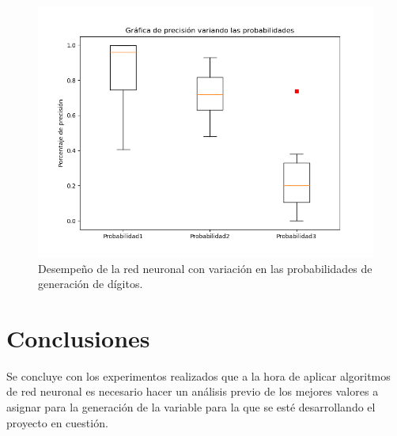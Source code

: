 \documentclass{article}
\begin{document}
\begin{figure}[H]
\centering
	\includegraphics[scale=0.8]{Figure_1.png}
	\caption{Desempeño de la red neuronal con variación en las probabilidades de generación de dígitos.}
	\label{1}		
\end{figure}



\section{Conclusiones}
Se concluye con los experimentos realizados que a la hora de aplicar algoritmos de red neuronal es necesario hacer un análisis previo de los mejores valores a asignar para la generación de la variable para la que se esté desarrollando el proyecto en cuestión.



\end{document}
